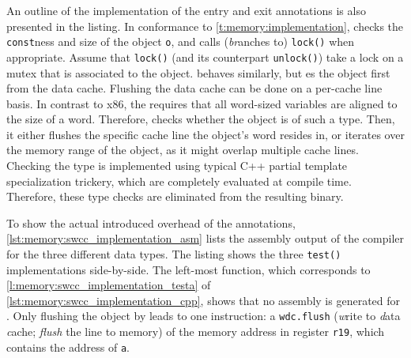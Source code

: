 An outline of the implementation of the entry and exit annotations is also presented in the listing.
In conformance to \cref{t:memory:implementation},  checks the \lstinline|const|ness and size of the object \lstinline|o|, and calls (\textit{br}anches to) \lstinline|lock()| when appropriate.
Assume that \lstinline|lock()| (and its counterpart \lstinline|unlock()|) take a lock on a mutex that is associated to the object.
 behaves similarly, but es the object first from the data cache.
Flushing the data cache can be done on a per-cache line basis.
In contrast to x86, the \MicroBlaze requires that all word-sized variables are aligned to the size of a word.
Therefore,  checks whether the object is of such a type.
Then, it either flushes the specific cache line the object's word resides in, or iterates over the memory range of the object, as it might overlap multiple cache lines.
Checking the type is implemented using typical C++ partial template specialization trickery, which are completely evaluated at compile time.
Therefore, these type checks are eliminated from the resulting binary.

To show the actual introduced overhead of the annotations, \vref{lst:memory:swcc_implementation_asm} lists the \MicroBlaze assembly output of the compiler for the three different data types.
The listing shows the three \lstinline|test()| implementations side-by-side.
The left-most function, which corresponds to \cref{l:memory:swcc_implementation_testa} of \cref{lst:memory:swcc_implementation_cpp}, shows that no assembly is generated for .
Only flushing the object by  leads to one instruction: a \lstinline|wdc.flush| (\textit{w}rite to \textit{d}ata \textit{c}ache; \textit{flush} the line to memory) of the memory address in register \lstinline|r19|, which contains the address of \lstinline|a|.

